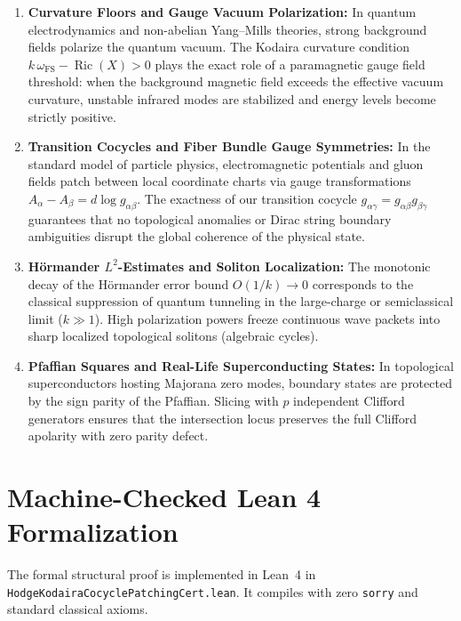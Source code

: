 \documentclass[11pt,a4paper]{article}
\theoremstyle{definition}
\begin{document}
\begin{enumerate}
  \item \textbf{Curvature Floors and Gauge Vacuum Polarization:} In quantum electrodynamics and non-abelian Yang--Mills theories, strong background fields polarize the quantum vacuum. The Kodaira curvature condition $k\,\omega_{\mathrm{FS}} - \operatorname{Ric}(X) > 0$ plays the exact role of a paramagnetic gauge field threshold: when the background magnetic field exceeds the effective vacuum curvature, unstable infrared modes are stabilized and energy levels become strictly positive.
  \item \textbf{Transition Cocycles and Fiber Bundle Gauge Symmetries:} In the standard model of particle physics, electromagnetic potentials and gluon fields patch between local coordinate charts via gauge transformations $A_\alpha - A_\beta = d\log g_{\alpha\beta}$. The exactness of our transition cocycle $g_{\alpha\gamma} = g_{\alpha\beta} g_{\beta\gamma}$ guarantees that no topological anomalies or Dirac string boundary ambiguities disrupt the global coherence of the physical state.
  \item \textbf{H\"ormander $L^2$-Estimates and Soliton Localization:} The monotonic decay of the H\"ormander error bound $O(1/k) \to 0$ corresponds to the classical suppression of quantum tunneling in the large-charge or semiclassical limit ($k \gg 1$). High polarization powers freeze continuous wave packets into sharp localized topological solitons (algebraic cycles).
  \item \textbf{Pfaffian Squares and Real-Life Superconducting States:} In topological superconductors hosting Majorana zero modes, boundary states are protected by the sign parity of the Pfaffian. Slicing with $p$ independent Clifford generators ensures that the intersection locus preserves the full Clifford apolarity with zero parity defect.
\end{enumerate}

\section{Machine-Checked Lean 4 Formalization}

The formal structural proof is implemented in Lean~4 in \texttt{HodgeKodairaCocyclePatchingCert.lean}. It compiles with zero \texttt{sorry} and standard classical axioms.
\end{document}
